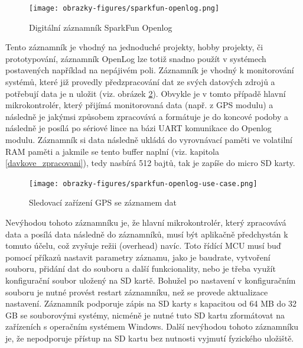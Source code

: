 \begin{figure}[h]
    \centering
    \texttt{[image: obrazky-figures/sparkfun-openlog.png]}
    
    \caption{Digitální záznamník SparkFun Openlog \cite{cirkit_openlog}}
    \label{fig:sparkfun-openlog}
\end{figure}

Tento záznamník je vhodný na jednoduché projekty, hobby projekty, či prototypování, záznamník OpenLog lze totiž snadno použít v systémech postavených například na nepájivém poli. Záznamník je vhodný k monitorování systémů, které již provedly předzpracování dat ze svých datových zdrojů a potřebují data je
n uložit (viz. obrázek \ref{fig:sparkfun-openlog-use-case}). Obvykle je v tomto případě hlavní mikrokontrolér, který přijímá monitorovaná data (např. z GPS modulu) a následně je jakýmsi způsobem zpracovává a formátuje je do koncové podoby a následně je posílá po sériové lince na bázi UART komunikace do Openlog modulu. Záznamník si data následně ukládá do vyrovnávací paměti ve volatilní RAM paměti a jakmile se tento buffer naplní (viz. kapitola \ref{davkove_zpracovani}), tedy nasbírá 512 bajtů, tak je zapíše do micro SD karty. \cite{cirkit_openlog}

\begin{figure}[h]
    \centering
    \texttt{[image: obrazky-figures/sparkfun-openlog-use-case.png]}
    
    \caption{Sledovací zařízení GPS se záznamem dat \cite{cirkit_openlog}}
    \label{fig:sparkfun-openlog-use-case}
\end{figure}

Nevýhodou tohoto záznamníku je, že hlavní mikrokontrolér, který zpracovává data a posílá data následně do záznamníků, musí být aplikačně předchystán k tomuto účelu, což zvyšuje režii (overhead) navíc. Toto řídící MCU musí buď pomocí příkazů nastavit parametry záznamu, jako je baudrate, vytvoření souboru, přidání dat do souboru a další funkcionality, nebo je třeba využít konfigurační soubor uložený na SD kartě. Bohužel po nastavení v konfiguračním souboru je nutné provést restart záznamníku, než se provede aktualizace nastavení. Záznamník podporuje zápis na SD karty s kapacitou od 64 MB do 32 GB se souborovými systémy, nicméně je nutné tuto SD kartu zformátovat na zařízeních s operačním systémem Windows. Další nevýhodou tohoto záznamníku je, že nepodporuje přístup na SD kartu bez nutnosti vyjmutí fyzického uložiště.

